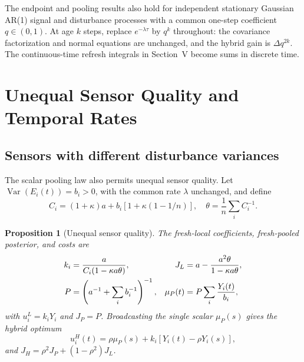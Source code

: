 \documentclass[letterpaper,10pt,conference]{ieeeconf}
\newtheorem{proposition}{Proposition}
\newcommand{\Var}{\operatorname{Var}}
\begin{document}
The endpoint and pooling results also hold for independent stationary Gaussian AR(1) signal and disturbance processes with a common one-step coefficient $q\in(0,1)$. At age $k$ steps, replace $e^{-\lambda\tau}$ by $q^k$ throughout: the covariance factorization and normal equations are unchanged, and the hybrid gain is $\Delta q^{2k}$. The continuous-time refresh integrals in Section~V become sums in discrete time.

\section{Unequal Sensor Quality and Temporal Rates}
\subsection{Sensors with different disturbance variances}
The scalar pooling law also permits unequal sensor quality. Let $\Var(E_i(t))=b_i>0$, with the common rate $\lambda$ unchanged, and define
\begin{equation}
 C_i=(1+\kappa)a+b_i[1+\kappa(1-1/n)],
 \quad \theta=\frac1n\sum_i C_i^{-1}.\label{eq:heterodefs}
\end{equation}
\begin{proposition}[Unequal sensor quality]\label{prop:hetero}
The fresh-local coefficients, fresh-pooled posterior, and costs are
\begin{align}
 k_i&=\frac{a}{C_i(1-\kappa a\theta)},&
 J_L&=a-\frac{a^2\theta}{1-\kappa a\theta},\notag\\
 P&=\left(a^{-1}+\sum_i b_i^{-1}\right)^{-1},&
 \mu_P(t)&=P\sum_i\frac{Y_i(t)}{b_i},\label{eq:hetero}
\end{align}
with $u_i^L=k_iY_i$ and $J_P=P$. Broadcasting the single scalar $\mu_P(s)$ gives the hybrid optimum
\begin{equation}
 u_i^H(t)=\rho\mu_P(s)+k_i[Y_i(t)-\rho Y_i(s)],\label{eq:heteropolicy}
\end{equation}
and $J_H=\rho^2J_P+(1-\rho^2)J_L$.
\end{proposition}
\end{document}

